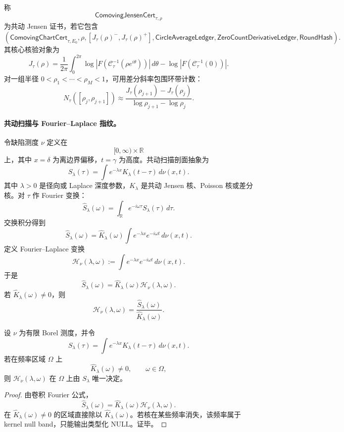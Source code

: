 \begin{definition}[共动 Jensen 证书]\label{def:typed-address-biaxial-completion-comoving-jensen-cert}
称
\[
\mathsf{ComovingJensenCert}_{\tau,\rho}
\]
为共动 Jensen 证书，若它包含
\[
\left(
\mathsf{ComovingChartCert}_{\tau,E_0},
\rho,
[J_\tau(\rho)^-,J_\tau(\rho)^+],
\mathsf{CircleAverageLedger},
\mathsf{ZeroCountDerivativeLedger},
\mathsf{RoundHash}
\right).
\]
其核心核验对象为
\[
J_\tau(\rho)
=
\frac1{2\pi}
\int_0^{2\pi}
\log\left|F(\mathcal C_\tau^{-1}(\rho e^{i\theta}))\right|\,d\theta
-\log\left|F(\mathcal C_\tau^{-1}(0))\right|.
\]
对一组半径 \(0<\rho_1<\cdots<\rho_M<1\)，可用差分斜率包围环带计数：
\[
N_\tau([\rho_j,\rho_{j+1}])
\approx
\frac{J_\tau(\rho_{j+1})-J_\tau(\rho_j)}
{\log\rho_{j+1}-\log\rho_j}.
\]
\end{definition}

\paragraph{共动扫描与 Fourier--Laplace 指纹。}
令缺陷测度 \(\nu\) 定义在
\[
[0,\infty)\times\mathbb R
\]
上，其中 \(x=\delta\) 为离边界偏移，\(t=\gamma\) 为高度。共动扫描剖面抽象为
\[
\boxed{
S_\lambda(\tau)
=
\int e^{-\lambda x}K_\lambda(t-\tau)\,d\nu(x,t).
}
\]
其中 \(\lambda>0\) 是径向或 Laplace 深度参数，\(K_\lambda\) 是共动 Jensen 核、Poisson 核或差分核。对 \(\tau\) 作 Fourier 变换：
\[
\widehat S_\lambda(\omega)
=
\int_{\mathbb R}e^{-i\omega\tau}S_\lambda(\tau)\,d\tau.
\]
交换积分得到
\[
\widehat S_\lambda(\omega)
=
\widehat K_\lambda(\omega)
\int e^{-\lambda x}e^{-i\omega t}\,d\nu(x,t).
\]
定义 Fourier--Laplace 变换
\[
\boxed{
\mathcal H_\nu(\lambda,\omega)
:=
\int e^{-\lambda x}e^{-i\omega t}\,d\nu(x,t).
}
\]
于是
\[
\widehat S_\lambda(\omega)
=
\widehat K_\lambda(\omega)\mathcal H_\nu(\lambda,\omega).
\]
若 \(\widehat K_\lambda(\omega)\ne0\)，则
\[
\mathcal H_\nu(\lambda,\omega)
=
\frac{\widehat S_\lambda(\omega)}
{\widehat K_\lambda(\omega)}.
\]

\begin{theorem}\label{thm:typed-address-biaxial-completion-comoving-scan-fourier-completeness}
设 \(\nu\) 为有限 Borel 测度，并令
\[
S_\lambda(\tau)
=
\int e^{-\lambda x}K_\lambda(t-\tau)\,d\nu(x,t).
\]
若在频率区域 \(\Omega\) 上
\[
\widehat K_\lambda(\omega)\ne0,
\qquad \omega\in\Omega,
\]
则 \(\mathcal H_\nu(\lambda,\omega)\) 在 \(\Omega\) 上由 \(S_\lambda\) 唯一决定。
\end{theorem}
\begin{proof}
由卷积 Fourier 公式，
\[
\widehat S_\lambda(\omega)
=
\widehat K_\lambda(\omega)\mathcal H_\nu(\lambda,\omega).
\]
在 \(\widehat K_\lambda(\omega)\ne0\) 的区域直接除以 \(\widehat K_\lambda(\omega)\)。若核在某些频率消失，该频率属于 kernel null band，只能输出类型化 \(\mathrm{NULL}\)。证毕。
\end{proof}


